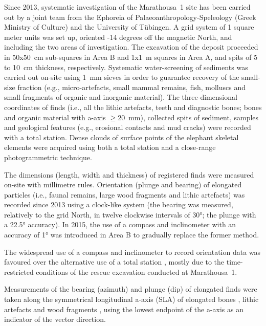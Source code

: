 \documentclass[preprint,authoryear,times]{elsarticle} %
\begin{document}
Since 2013, systematic investigation of the Marathousa~1 site has been carried out by a joint team from the Ephoreia of Palaeoanthropology-Speleology (Greek Ministry of Culture) and the University of Tübingen. A grid system of 1 square meter units was set up, oriented -14 degrees off the magnetic North, and including the two areas of investigation. The excavation of the deposit proceeded in 50x50~cm sub-squares in Area B and 1x1~m squares in Area A, and spits of 5 to 10~cm thickness, respectively. Systematic water-screening of sediments was carried out on-site using 1~mm sieves in order to guarantee recovery of the small-size fraction (e.g., micro-artefacts, small mammal remains, fish, molluscs and small fragments of organic and inorganic material). The three-dimensional coordinates of finds (i.e., all the lithic artefacts, teeth and diagnostic bones; bones and organic material with a-axis $\geq20$~mm), collected spits of sediment, samples and geological features (e.g., erosional contacts and mud cracks) were recorded with a total station. Dense clouds of surface points of the elephant skeletal elements were acquired using both a total station and a close-range photogrammetric technique.

The dimensions (length, width and thickness) of registered finds were measured on-site with millimetre rules. Orientation (plunge and bearing) of elongated particles (i.e., faunal remains, large wood fragments and lithic artefacts) was recorded since 2013 using a clock-like system (the bearing was measured, relatively to the grid North, in twelve clockwise intervals of 30°; the plunge with a 22.5° accuracy). In 2015, the use of a compass and inclinometer with an accuracy of 1° was introduced in Area B to gradually replace the former method.

The widespread use of a compass and inclinometer to record orientation data \citep[][among others]{Voorhies1969,Fiorillo1991,Bertran1995,Bertran1997,Lenoble2004,Eberth2007,Eren2010,Benito-Calvo2011a,Dominguez-Rodrigo2012,Dominguez-Rodrigo2013,Dominguez-Rodrigo2014,Cobo-Sanchez2014,Organista2017} was favoured over the alternative use of a total station \citep[][among others]{Kluskens1990,Dibble1997,McPherron2005,Enloe2006,Bernatchez2010}, mostly due to the time-restricted conditions of the rescue excavation conducted at Marathousa~1.

Measurements of the bearing (azimuth) and plunge (dip) of elongated finds were taken along the symmetrical longitudinal a-axis (SLA) of elongated bones \citep{Dominguez-Rodrigo2013}, lithic artefacts \citep{Bertran1995} and wood fragments \citep{Macdonald1985}, using the lowest endpoint of the a-axis as an indicator of the vector direction.
\end{document}
